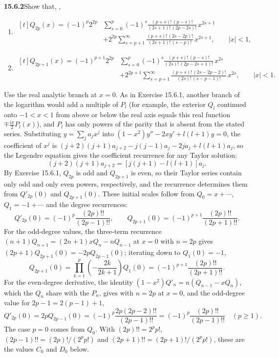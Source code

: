 \par\bigskip
\noindent\textbf{15.6.2}\quad Show that, ,
\begin{enumerate}
\item[(a)]
$\begin{aligned}[t]
Q_{2p}(x)=(-1)^{p}2^{2p}&\sum_{s=0}^{p}(-1)^{s}
\frac{(p+s)!\,(p-s)!}{(2s+1)!\,(2p-2s)!}\,x^{2s+1}\\
&+2^{2p}\sum_{s=p+1}^{\infty}
\frac{(p+s)!\,(2s-2p)!}{(2s+1)!\,(s-p)!}\,x^{2s+1},\qquad|x|<1,
\end{aligned}$
\item[(b)]
$\begin{aligned}[t]
Q_{2p+1}(x)=(-1)^{p+1}2^{2p}&\sum_{s=0}^{p}(-1)^{s}
\frac{(p+s)!\,(p-s)!}{(2s)!\,(2p-2s+1)!}\,x^{2s}\\
&+2^{2p+1}\sum_{s=p+1}^{\infty}
\frac{(p+s)!\,(2s-2p-2)!}{(2s)!\,(s-p-1)!}\,x^{2s},\qquad|x|<1.
\end{aligned}$
\end{enumerate}
\solution
Use the real analytic branch at $x=0$. As in Exercise 15.6.1, another
branch of the logarithm would add a multiple of $P_l$ (for example,
the exterior $Q_l$ continued onto $-1<x<1$ from above or below the
real axis equals this real function $\mp\frac{i\pi}2P_l(x)$), and
$P_l$ has only powers of the parity that is absent from the stated
series. Substituting
$y=\sum_ja_jx^j$ into $(1-x^2)y''-2xy'+l(l+1)y=0$, the coefficient of
$x^j$ is $(j+2)(j+1)a_{j+2}-j(j-1)a_j-2ja_j+l(l+1)a_j$, so the Legendre
equation gives the coefficient recurrence for any Taylor solution:
\[
(j+2)(j+1)a_{j+2}
=[j(j+1)-l(l+1)]a_j.
\]
By Exercise 15.6.1, $Q_{2p}$ is odd and $Q_{2p+1}$ is even, so their
Taylor series contain only odd and only even powers, respectively, and
the recurrence determines them from $Q'_{2p}(0)$ and $Q_{2p+1}(0)$.
These initial scales follow from $Q_0=x+\cdots$, $Q_1=-1+\cdots$
and the degree recurrences:
\[
Q'_{2p}(0)=(-1)^p\frac{(2p)!!}{(2p-1)!!},\qquad
Q_{2p+1}(0)=(-1)^{p+1}\frac{(2p)!!}{(2p+1)!!}.
\]
For the odd-degree values, the three-term recurrence
$(n+1)Q_{n+1}=(2n+1)xQ_n-nQ_{n-1}$ at $x=0$ with $n=2p$ gives
$(2p+1)Q_{2p+1}(0)=-2pQ_{2p-1}(0)$; iterating down to $Q_1(0)=-1$,
\[
Q_{2p+1}(0)=\prod_{k=1}^p\left(-\frac{2k}{2k+1}\right)Q_1(0)
=(-1)^{p+1}\frac{(2p)!!}{(2p+1)!!}.
\]
For the even-degree derivative, the identity
$(1-x^2)Q'_n=n(Q_{n-1}-xQ_n)$, which the $Q_n$ share with the $P_n$,
gives with $n=2p$ at $x=0$, and the odd-degree value for
$2p-1=2(p-1)+1$,
\[
Q'_{2p}(0)=2pQ_{2p-1}(0)
=(-1)^p\frac{2p(2p-2)!!}{(2p-1)!!}
=(-1)^p\frac{(2p)!!}{(2p-1)!!}\quad(p\ge1).
\]
The case $p=0$ comes from $Q_0$. With $(2p)!!=2^pp!$,
$(2p-1)!!=(2p)!/(2^pp!)$ and $(2p+1)!!=(2p+1)!/(2^pp!)$, these are
the values $C_0$ and $D_0$ below.

